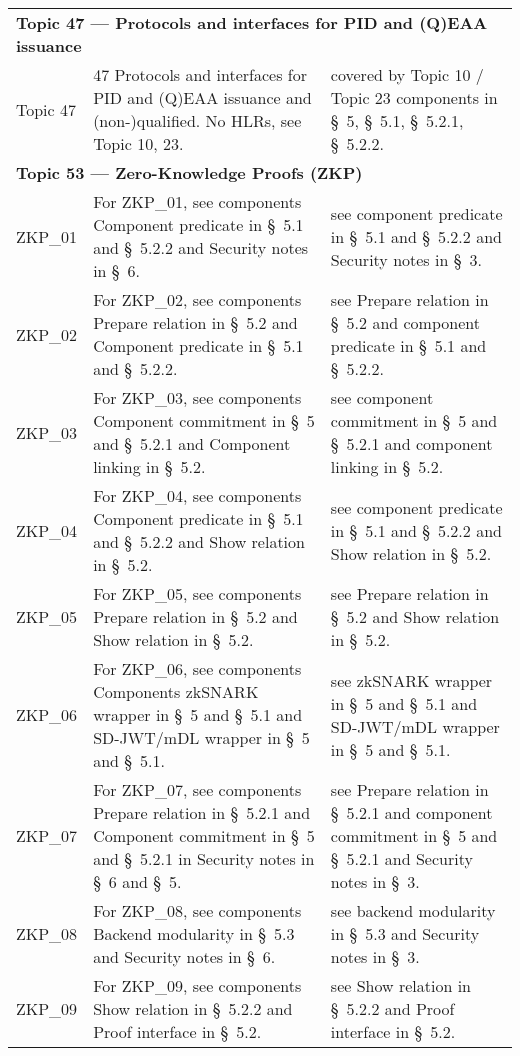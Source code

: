 \begin{landscape}
\begin{longtable}{p{3cm} p{10cm} p{7cm}}
\multicolumn{3}{l}{\textbf{Topic 47 — Protocols and interfaces for PID and (Q)EAA issuance}}\\

Topic 47 &
47 Protocols and interfaces for PID and (Q)EAA issuance and (non-)qualified. No HLRs, see Topic 10, 23. &
covered by Topic 10 / Topic 23 components in \S~5, \S~5.1, \S~5.2.1, \S~5.2.2. \\[1em]

\multicolumn{3}{l}{\textbf{Topic 53 — Zero-Knowledge Proofs (ZKP)}}\\

ZKP\_01 &
For ZKP\_01, see components Component predicate in \S~5.1 and \S~5.2.2 and Security notes in \S~6. &
see component predicate in \S~5.1 and \S~5.2.2 and Security notes in \S~3. \\

ZKP\_02 &
For ZKP\_02, see components Prepare relation in \S~5.2 and Component predicate in \S~5.1 and \S~5.2.2. &
see Prepare relation in \S~5.2 and component predicate in \S~5.1 and \S~5.2.2. \\

ZKP\_03 &
For ZKP\_03, see components Component commitment in \S~5 and \S~5.2.1 and Component linking in \S~5.2. &
see component commitment in \S~5 and \S~5.2.1 and component linking in \S~5.2. \\

ZKP\_04 &
For ZKP\_04, see components Component predicate in \S~5.1 and \S~5.2.2 and Show relation in \S~5.2. &
see component predicate in \S~5.1 and \S~5.2.2 and Show relation in \S~5.2. \\

ZKP\_05 &
For ZKP\_05, see components Prepare relation in \S~5.2 and Show relation in \S~5.2. &
see Prepare relation in \S~5.2 and Show relation in \S~5.2. \\

ZKP\_06 &
For ZKP\_06, see components Components zkSNARK wrapper in \S~5 and \S~5.1 and SD-JWT/mDL wrapper in \S~5 and \S~5.1. &
see zkSNARK wrapper in \S~5 and \S~5.1 and SD-JWT/mDL wrapper in \S~5 and \S~5.1. \\

ZKP\_07 &
For ZKP\_07, see components Prepare relation in \S~5.2.1 and Component commitment in \S~5 and \S~5.2.1 in Security notes in \S~6 and \S~5. &
see Prepare relation in \S~5.2.1 and component commitment in \S~5 and \S~5.2.1 and Security notes in \S~3. \\

ZKP\_08 &
For ZKP\_08, see components Backend modularity in \S~5.3 and Security notes in \S~6. &
see backend modularity in \S~5.3 and Security notes in \S~3. \\

ZKP\_09 &
For ZKP\_09, see components Show relation in \S~5.2.2 and Proof interface in \S~5.2. &
see Show relation in \S~5.2.2 and Proof interface in \S~5.2. \\

\end{longtable}
\end{landscape}





